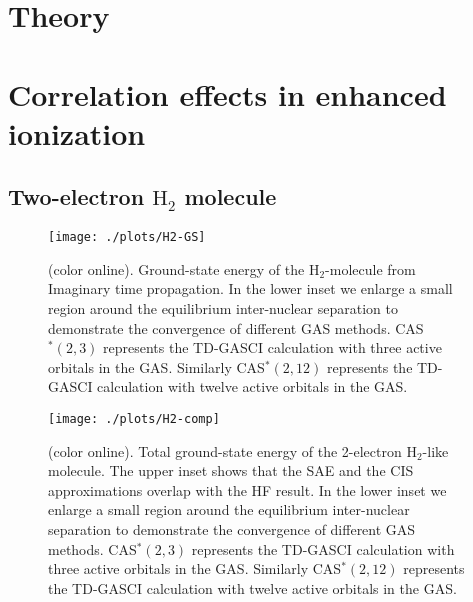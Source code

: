 \documentclass[twocolumn,aps,showpacs,superscriptaddress,longbibliography]{revtex4-1}
\begin{document}
\section{Theory}
\label{theory}

\section{Correlation effects in enhanced ionization}
\label{numerical_ex}


\subsection{Two-electron $\mathrm{H}_2$ molecule}
\label{h2}
\begin{figure}
 \texttt{[image: ./plots/H2-GS]}
 \caption{(color online). Ground-state energy of the  $\mathrm{H}_2$-molecule from Imaginary time
           propagation.
           In the lower inset we enlarge a small region around the equilibrium inter-nuclear separation
           to demonstrate the convergence of different GAS methods.
           CAS$^*(2,3)$ represents the TD-GASCI calculation with three active orbitals in the GAS.
           Similarly  CAS$^*(2,12)$ represents the TD-GASCI calculation with twelve active orbitals
           in the GAS.}
 \label{fig:H2-binding}
\end{figure}

\begin{figure}
 \texttt{[image: ./plots/H2-comp]}
 \caption{(color online). Total ground-state energy of the 2-electron $\mathrm{H}_2$-like molecule.
           The upper inset shows that the SAE and the CIS approximations overlap with the HF result.
           In the lower inset we enlarge a small region around the equilibrium inter-nuclear separation
           to demonstrate the convergence of different GAS methods.
           CAS$^*(2,3)$ represents the TD-GASCI calculation with three active orbitals in the GAS.
           Similarly  CAS$^*(2,12)$ represents the TD-GASCI calculation with twelve active orbitals
           in the GAS.}
 \label{fig:H2-comparison}
\end{figure}
\end{document}
